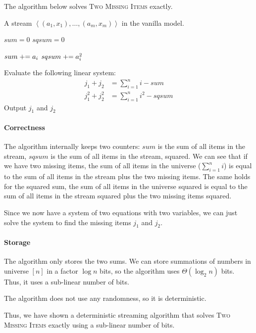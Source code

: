 The algorithm below solves \textsc{Two Missing Items} exactly.

\begin{minipage}{\textwidth}
\begin{sourcecode}
A stream $\left<(a_1, x_1), \ldots , (a_m, x_m)\right>$ in the vanilla model.
\silend

$sum = 0$
$sqsum = 0$
\silend

$sum \mathrel{+}= a_i$
$sqsum \mathrel{+}= a_i^2$
\silend

Evaluate the following linear system: \begin{align*}j_1 + j_2 &= \sum_{i=1}^n{i} - sum\\ j_1^2 + j_2^2 &= \sum_{i=1}^n{i^2} - sqsum\end{align*}
Output $j_1$ and $j_2$
\silend
\end{sourcecode}
\end{minipage}

\paragraph{Correctness} The algorithm internally keeps two counters: $sum$ is the sum of all items in the stream, $sqsum$ is the sum of all items in the stream, squared.
We can see that if we have two missing items, the sum of all items in the universe ($\sum_{i=1}^n{i}$) is equal to the sum of all items in the stream plus the two missing items.
The same holds for the squared sum, the sum of all items in the universe squared is equal to the sum of all items in the stream squared plus the two missing items squared.

Since we now have a system of two equations with two variables, we can just solve the system to find the missing items $j_1$ and $j_2$.

\paragraph{Storage} The algorithm only stores the two sums.
We can store summations of numbers in universe $[n]$ in a factor $\log{n}$ bits, so the algorithm uses $\Theta(\log_2{n})$ bits.
Thus, it uses a sub-linear number of bits.

The algorithm does not use any randomness, so it is deterministic.

Thus, we have shown a deterministic streaming algorithm that solves \textsc{Two Missing Items} exactly using a sub-linear number of bits.
